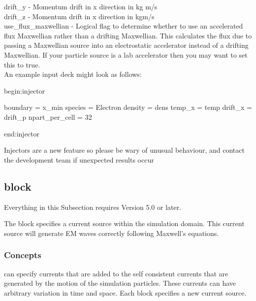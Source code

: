 {\emphtext drift\_y} - Momentum drift in x direction in kg m/s\\

{\emphtext drift\_z} - Momentum drift in x direction in kgm/s\\

{\emphtext use\_flux\_maxwellian} - Logical flag to determine whether to use
  an accelerated flux Maxwellian rather than a drifting Maxwellian. This
  calculates the flux due to passing a Maxwellian source into an electrostatic
  accelerator instead of a drifting Maxwellian. If your particle source is a
  lab accelerator then you may want to set this to true.\\

An example input deck might look as follows:\\

\begin{boxverbatim}
begin:injector

  boundary = x_min
  species = Electron
  density = dens
  temp_x = temp
  drift_x = drift_p
  npart_per_cell = 32

end:injector
\end{boxverbatim}

{\emphtext
Injectors are a new feature so please be wary of unusual behaviour, and
contact the {\EPOCH} development team if unexpected results occur}

\subsection{\texorpdfstring
  { block}
  {           {antenna} block}}
\label{sec:antenna_block}

{\emphtext
Everything in this Subsection requires {\EPOCH} Version 5.0 or later.}

The  block specifies a current source within the simulation
domain. This current source will generate EM waves correctly following Maxwell's
equations.

\subsubsection{Concepts}

{\EPOCH} can specify currents that are added to the self consistent currents
that are generated by the motion of the simulation particles. These currents
can have arbitrary variation in time and space. Each  block
specifies a new current source.

